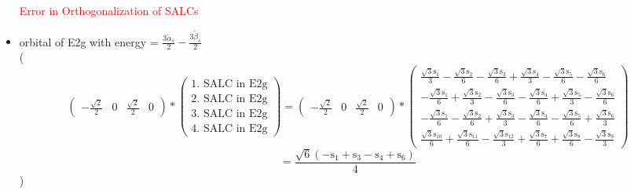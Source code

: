 \documentclass[12pt,a4paper]{article}
\begin{document}
\begin{itemize}
\textcolor{red}{Error in Orthogonalization of SALCs}\item orbital of E2g with energy = 
                                $\frac{3 \tilde{\alpha}_{s}}{2} - \frac{3 \tilde{\beta}_{s}}{2}$ \\
( 
$$
\begin{pmatrix}- \frac{\sqrt{2}}{2} & 0 & \frac{\sqrt{2}}{2} & 0\end{pmatrix} * \left(\begin{array}{c}\text{1. SALC in E2g} \\ \text{2. SALC in E2g} \\ \text{3. SALC in E2g} \\ \text{4. SALC in E2g}\end{array}\right) = \begin{pmatrix}- \frac{\sqrt{2}}{2} & 0 & \frac{\sqrt{2}}{2} & 0\end{pmatrix} * \begin{pmatrix}\frac{\sqrt{3} \text{s}_{1}}{3} - \frac{\sqrt{3} \text{s}_{2}}{6} - \frac{\sqrt{3} \text{s}_{3}}{6} + \frac{\sqrt{3} \text{s}_{4}}{3} - \frac{\sqrt{3} \text{s}_{5}}{6} - \frac{\sqrt{3} \text{s}_{6}}{6}\\- \frac{\sqrt{3} \text{s}_{1}}{6} + \frac{\sqrt{3} \text{s}_{2}}{3} - \frac{\sqrt{3} \text{s}_{3}}{6} - \frac{\sqrt{3} \text{s}_{4}}{6} + \frac{\sqrt{3} \text{s}_{5}}{3} - \frac{\sqrt{3} \text{s}_{6}}{6}\\- \frac{\sqrt{3} \text{s}_{1}}{6} - \frac{\sqrt{3} \text{s}_{2}}{6} + \frac{\sqrt{3} \text{s}_{3}}{3} - \frac{\sqrt{3} \text{s}_{4}}{6} - \frac{\sqrt{3} \text{s}_{5}}{6} + \frac{\sqrt{3} \text{s}_{6}}{3}\\\frac{\sqrt{3} \text{s}_{10}}{6} + \frac{\sqrt{3} \text{s}_{11}}{6} - \frac{\sqrt{3} \text{s}_{12}}{3} + \frac{\sqrt{3} \text{s}_{7}}{6} + \frac{\sqrt{3} \text{s}_{8}}{6} - \frac{\sqrt{3} \text{s}_{9}}{3}\end{pmatrix} 
 $$ $$ = \frac{\sqrt{6} \left(- \text{s}_{1} + \text{s}_{3} - \text{s}_{4} + \text{s}_{6}\right)}{4} 
 $$ 
 )


\end{itemize}
\end{document}
